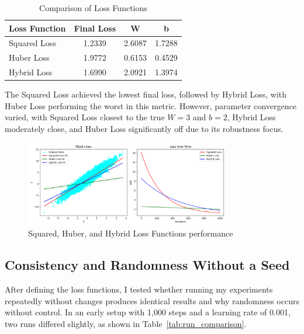 \documentclass{article}
\begin{document}
\begin{table}[h]
    \centering
    \caption{Comparison of Loss Functions}
    \label{tab:loss_comparison}
    \begin{tabular}{lccc}
        \toprule
        \textbf{Loss Function} & \textbf{Final Loss} & \textbf{W} & \textbf{b} \\
        \midrule
        Squared Loss           & 1.2339             & 2.6087    & 1.7288    \\
        Huber Loss             & 1.9772             & 0.6153    & 0.4529    \\
        Hybrid Loss            & 1.6990             & 2.0921    & 1.3974    \\
        \bottomrule
    \end{tabular}
\end{table}

The Squared Loss achieved the lowest final loss, followed by Hybrid Loss, with Huber Loss performing the worst in this metric. However, parameter convergence varied, with Squared Loss closest to the true \( W = 3 \) and \( b = 2 \), Hybrid Loss moderately close, and Huber Loss significantly off due to its robustness focus.

\begin{figure}[h]
    \centering
    \includegraphics[width=0.8\textwidth]{assets/simple_results.png}
    \caption{Squared, Huber, and Hybrid Loss Functions performance}
    \label{fig:loss_curves}
\end{figure}

\subsection{Consistency and Randomness Without a Seed}

After defining the loss functions, I tested whether running my experiments repeatedly without changes produces identical results and why randomness occurs without control. In an early setup with 1,000 steps and a learning rate of 0.001, two runs differed slightly, as shown in Table~\ref{tab:run_comparison}.
\end{document}
